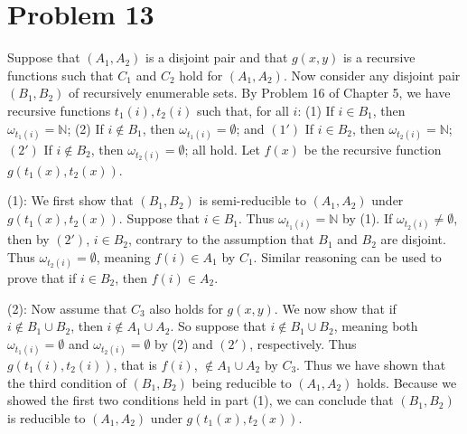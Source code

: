 \documentclass{article}
\newcommand{\N}{\mathbb{N}}
\theoremstyle{definition}
\begin{document}
\section*{Problem 13}
Suppose that $(A_1,A_2)$ is a disjoint pair and that $g(x,y)$ is a recursive functions such that $C_1$ and $C_2$ hold for $(A_1,A_2)$. Now consider any disjoint pair $(B_1,B_2)$ of 
recursively enumerable sets. By Problem 16 of Chapter 5, we have recursive functions $t_1(i),t_2(i)$ such that, for all $i$:\newline
(1) If $i\in B_1$, then $\omega_{t_1(i)}=\N$;\newline
(2) If $i\notin B_1$, then $\omega_{t_1(i)}=\emptyset$;\newline
and\newline
$(1')$ If $i\in B_2$, then $\omega_{t_2(i)}=\N$;\newline
$(2')$ If $i\notin B_2$, then $\omega_{t_2(i)}=\emptyset$;\newline
all hold. Let $f(x)$ be the recursive function $g(t_1(x),t_2(x))$.


(1): We first show that $(B_1,B_2)$ is semi-reducible to $(A_1,A_2)$ under $g(t_1(x),t_2(x))$. Suppose that $i\in B_1$. Thus $\omega_{t_1(i)}=\N$ by (1). If $\omega_{t_2(i)}\ne\emptyset$, then by 
$(2')$, $i\in B_2$, contrary to the assumption that $B_1$ and $B_2$ are disjoint. Thus $\omega_{t_2(i)}=\emptyset$, meaning $f(i)\in A_1$ by $C_1$. Similar reasoning can be used to prove that 
if $i\in B_2$, then $f(i)\in A_2$.


(2): Now assume that $C_3$ also holds for $g(x,y)$.
We now show that if $i\notin B_1\cup B_2$, then $i\notin A_1\cup A_2$. So suppose that $i\notin B_1\cup B_2$, meaning both $\omega_{t_1(i)}=\emptyset$ and $\omega_{t_2(i)}=\emptyset$ 
by (2) and $(2')$, respectively. Thus $g(t_1(i),t_2(i))$, that is $f(i)$, $\notin A_1\cup A_2$ by $C_3$. Thus we have shown that the third condition of $(B_1,B_2)$ being reducible to $(A_1,A_2)$ 
holds. Because we showed the first two conditions held in part (1), we can conclude that $(B_1,B_2)$ is reducible to $(A_1,A_2)$ under $g(t_1(x),t_2(x))$. 
\end{document}

